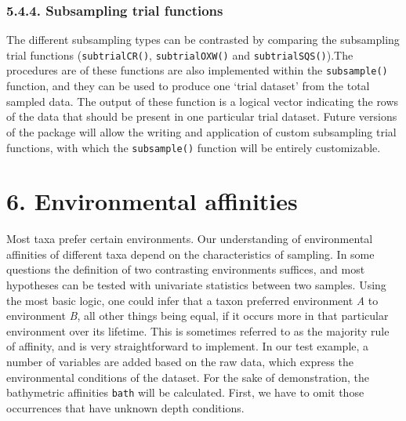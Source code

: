\documentclass[]{article}
\newenvironment{Shaded}{\begin{snugshade}}{\end{snugshade}}
\newcommand{\StringTok}[1]{\textcolor[rgb]{0.31,0.60,0.02}{{#1}}}
\newcommand{\NormalTok}[1]{{#1}}
\begin{document}
\subsubsection{5.4.4. Subsampling trial
functions}\label{subsampling-trial-functions}

The different subsampling types can be contrasted by comparing the
subsampling trial functions (\texttt{subtrialCR()},
\texttt{subtrialOXW()} and \texttt{subtrialSQS()}).The procedures are of
these functions are also implemented within the \texttt{subsample()}
function, and they can be used to produce one `trial dataset' from the
total sampled data. The output of these function is a logical vector
indicating the rows of the data that should be present in one particular
trial dataset. Future versions of the package will allow the writing and
application of custom subsampling trial functions, with which the
\texttt{subsample()} function will be entirely customizable.

\section{6. Environmental affinities}\label{environmental-affinities}

Most taxa prefer certain environments. Our understanding of
environmental affinities of different taxa depend on the characteristics
of sampling. In some questions the definition of two contrasting
environments suffices, and most hypotheses can be tested with univariate
statistics between two samples. Using the most basic logic, one could
infer that a taxon preferred environment \emph{A} to environment
\emph{B}, all other things being equal, if it occurs more in that
particular environment over its lifetime. This is sometimes referred to
as the majority rule of affinity, and is very straightforward to
implement. In our test example, a number of variables are added based on
the raw data, which express the environmental conditions of the dataset.
For the sake of demonstration, the bathymetric affinities \texttt{bath}
will be calculated. First, we have to omit those occurrences that have
unknown depth conditions.

\begin{Shaded}
\end{Shaded}
\end{document}
